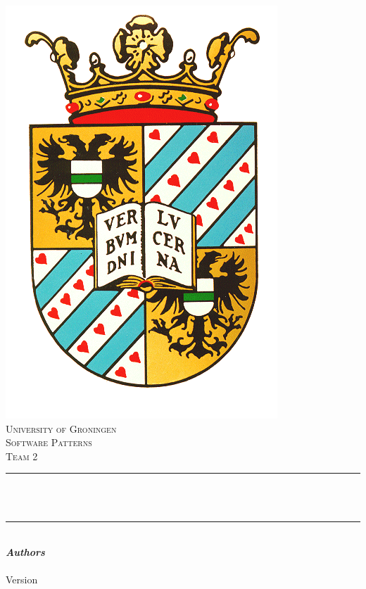 

\begin{titlepage}
    \centering

    \vspace*{0.5 cm}
    \includegraphics[scale = 0.25]{images/rug.png}\\[1.0 cm]	%
    \textsc{\LARGE University of Groningen}\\[0.3cm]
    \textsc{\large {Software Patterns}}\\
    \textsc{\large {Team 2}} \\[2.0 cm]
    \rule{\linewidth}{0.2 mm} \\[0.4 cm]
    {\huge \bfseries \thetitle}\\

    \rule{\linewidth}{0.2 mm} \\[1.5 cm]
    \textbf{\large\emph\textbf{Authors}}\\
    \theauthor
    \vspace{5cm}
    {\large \thedate}\\[0.25cm]
    Version \VersionNumber \\
    \renewcommand{\headrulewidth}{0pt}
    \vfill


\end{titlepage}

